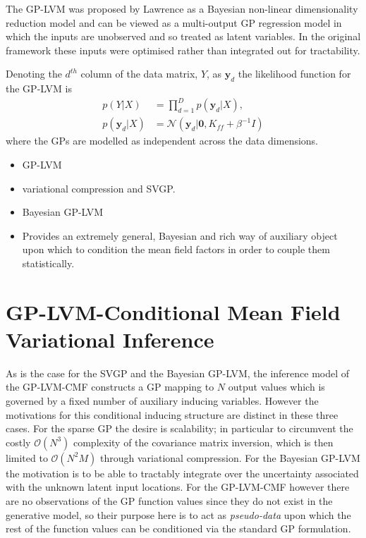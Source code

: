 \documentclass[]{article}
\begin{document}
The GP-LVM was proposed by Lawrence as a Bayesian non-linear dimensionality reduction model and can be viewed as a multi-output GP regression model in which the inputs are unobserved and so treated as latent variables.
In the original framework these inputs were optimised rather than integrated out for tractability.

Denoting the $d^{th}$ column of the data matrix, $Y$, as $\mathbf{y}_d$ the likelihood function for the GP-LVM is
%
\begin{align}
  p(Y|X) &= \prod_{d=1}^D p(\mathbf{y}_d | X),\\
  p(\mathbf{y}_d|X) &= \mathcal{N}(\mathbf{y}_d|\mathbf{0}, K_{ff}+\beta^{-1}I)
\end{align}
%
where the GPs are modelled as independent across the data dimensions.

\begin{itemize}
  \item GP-LVM
  \item variational compression and SVGP.
  \item Bayesian GP-LVM
  \item Provides an extremely general, Bayesian and rich way of auxiliary object upon which to condition the mean field factors in order to couple them statistically.
\end{itemize}

\section{GP-LVM-Conditional Mean Field Variational Inference} \label{sec:gplvmcmf}

As is the case for the SVGP and the Bayesian GP-LVM, the inference model of the GP-LVM-CMF constructs a GP mapping to $N$ output values which is governed by a fixed number of auxiliary inducing variables.
However the motivations for this conditional inducing structure are distinct in these three cases.
For the sparse GP the desire is scalability; in particular to circumvent the costly $\mathcal{O}(N^3)$ complexity of the covariance matrix inversion, which is then limited to $\mathcal{O}(N^2M)$ through variational compression.
For the Bayesian GP-LVM the motivation is to be able to tractably integrate over the uncertainty associated with the unknown latent input locations. For the GP-LVM-CMF however there are no observations of the GP function values since they do not exist in the generative model, so their purpose here is to act as \emph{pseudo-data} upon which the rest of the function values can be conditioned via the standard GP formulation.
\end{document}
